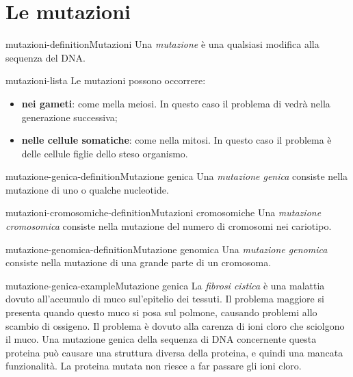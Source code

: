 \documentclass[preview]{standalone}
\begin{document}
\genpage

\section{Le mutazioni}


\begin{snippetdefinition}{mutazioni-definition}{Mutazioni}
    Una \textit{mutazione} è una qualsiasi modifica alla sequenza del DNA.
\end{snippetdefinition}


\begin{snippet}{mutazioni-lista}
    Le mutazioni possono occorrere:
    \begin{itemize}
        \item \textbf{nei gameti}: come mella meiosi.
            In questo caso il problema di vedrà nella generazione successiva;
        \item \textbf{nelle cellule somatiche}: come nella mitosi.
            In questo caso il problema è delle cellule figlie dello steso organismo.
    \end{itemize}
\end{snippet}

\begin{snippetdefinition}{mutazione-genica-definition}{Mutazione genica}
    Una \textit{mutazione genica} consiste nella mutazione
    di uno o qualche nucleotide.
\end{snippetdefinition}

\begin{snippetdefinition}{mutazioni-cromosomiche-definition}{Mutazioni cromosomiche}
    Una \textit{mutazione cromosomica} consiste nella mutazione
    del numero di cromosomi nei cariotipo.
\end{snippetdefinition}

\begin{snippetdefinition}{mutazione-genomica-definition}{Mutazione genomica}
    Una \textit{mutazione genomica} consiste nella mutazione
    di una grande parte di un cromosoma.
\end{snippetdefinition}

\begin{snippetexample}{mutazione-genica-example}{Mutazione genica}
    La \textit{fibrosi cistica} è una malattia dovuto all'accumulo di muco sul'epitelio dei tessuti.
    Il problema maggiore si presenta quando questo muco si posa sul polmone, causando problemi
    allo scambio di ossigeno. Il problema è dovuto alla carenza di ioni cloro che sciolgono il muco.
    Una mutazione genica della sequenza di DNA concernente questa proteina può causare
    una struttura diversa della proteina, e quindi una mancata funzionalità. La proteina mutata
    non riesce a far passare gli ioni cloro.
\end{snippetexample}
\end{document}

